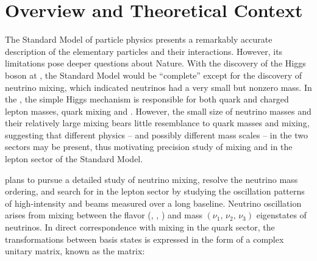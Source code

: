 \section{Overview and Theoretical Context}

\label{sec:physics-lbnosc-context}

The Standard Model of particle physics presents a remarkably accurate
description of the elementary particles and their
interactions. However, its limitations pose deeper questions about
Nature. With the discovery of the Higgs boson at , the Standard
Model would be ``complete'' except for the discovery of neutrino
mixing, which indicated neutrinos had a very small but nonzero
mass. In the , %
the simple Higgs mechanism is responsible
for both quark and charged lepton masses, quark mixing and
. %
However, the small size of neutrino
masses and their relatively large mixing bears little resemblance to
quark masses and mixing, suggesting that different physics -- and
possibly different mass scales -- in the two sectors may be present,
thus motivating precision study of mixing and  %
in the
lepton sector of the Standard Model. 


 plans to pursue a detailed study of neutrino mixing, resolve the
neutrino mass ordering, and search for  %
in the lepton
sector by studying the oscillation patterns of
high-intensity \numu and \anumu %
beams measured over a long baseline.  Neutrino oscillation arises from
mixing between the flavor 
(\nue, \numu, \nutau) and mass $(\nu_1,\, \nu_2,\, \nu_3)$ eigenstates
of neutrinos.
In direct correspondence with mixing in the quark sector, the transformations
between basis states is expressed in the form of a complex unitary
matrix, known as the  matrix: %

